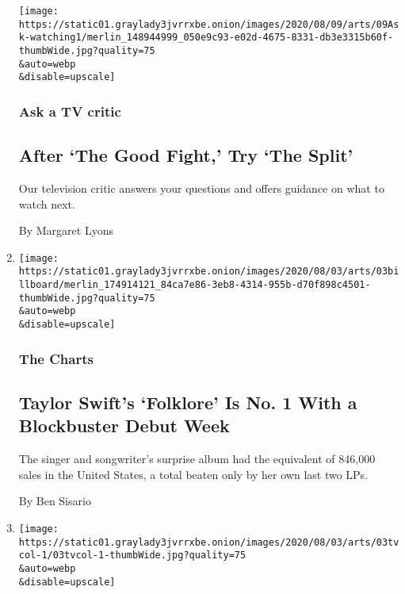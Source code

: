 \begin{enumerate}
  \texttt{[image: https://static01.graylady3jvrrxbe.onion/images/2020/08/09/arts/09Ask-watching1/merlin\_148944999\_050e9c93-e02d-4675-8331-db3e3315b60f-thumbWide.jpg?quality=75\\\&auto=webp\\\&disable=upscale]}

  \hypertarget{ask-a-tv-critic}{%
  \subsubsection{Ask a TV critic}\label{ask-a-tv-critic}}

  \hypertarget{after-the-good-fight-try-the-split}{%
  \subsection{After `The Good Fight,' Try `The
  Split'}\label{after-the-good-fight-try-the-split}}

  Our television critic answers your questions and offers guidance on
  what to watch next.

  By Margaret Lyons
\item
  \href{/2020/08/03/arts/music/taylor-swift-folklore-billboard-chart.html}{}

  \texttt{[image: https://static01.graylady3jvrrxbe.onion/images/2020/08/03/arts/03billboard/merlin\_174914121\_84ca7e86-3eb8-4314-955b-d70f898c4501-thumbWide.jpg?quality=75\\\&auto=webp\\\&disable=upscale]}

  \hypertarget{the-charts}{%
  \subsubsection{The Charts}\label{the-charts}}

  \hypertarget{taylor-swifts-folklore-is-no-1-with-a-blockbuster-debut-week}{%
  \subsection{Taylor Swift's `Folklore' Is No. 1 With a Blockbuster
  Debut
  Week}\label{taylor-swifts-folklore-is-no-1-with-a-blockbuster-debut-week}}

  The singer and songwriter's surprise album had the equivalent of
  846,000 sales in the United States, a total beaten only by her own
  last two LPs.

  By Ben Sisario
\item
  \href{/2020/08/03/arts/television/whats-on-tv-monday-immigration-nation-and-dora-and-the-lost-city-of-gold.html}{}

  \texttt{[image: https://static01.graylady3jvrrxbe.onion/images/2020/08/03/arts/03tvcol-1/03tvcol-1-thumbWide.jpg?quality=75\\\&auto=webp\\\&disable=upscale]}


\end{enumerate}
